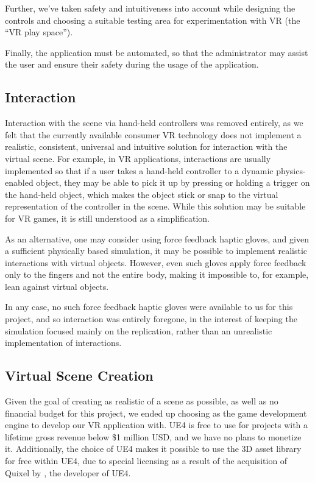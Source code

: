 Further, we've taken safety and intuitiveness into account while designing the controls and choosing a suitable testing area for experimentation with \ac{VR} (the ``\ac{VR} play space'').

Finally, the application must be automated, so that the administrator may assist the user and ensure their safety during the usage of the application.

\subsection{Interaction}
Interaction with the scene via hand-held controllers was removed entirely, as we felt that the currently available consumer \ac{VR} technology does not implement a realistic, consistent, universal and intuitive solution for interaction with the virtual scene. For example, in \ac{VR} applications, interactions are usually implemented so that if a user takes a hand-held controller to a dynamic physics-enabled object, they may be able to pick it up by pressing or holding a trigger on the hand-held object, which makes the object stick or snap to the virtual representation of the controller in the scene. While this solution may be suitable for \ac{VR} games, it is still understood as a simplification.

As an alternative, one may consider using force feedback haptic gloves, and given a sufficient physically based simulation, it may be possible to implement realistic interactions with virtual objects. However, even such gloves apply force feedback only to the fingers and not the entire body, making it impossible to, for example, lean against virtual objects.

In any case, no such force feedback haptic gloves were available to us for this project, and so interaction was entirely foregone, in the interest of keeping the simulation focused mainly on the replication, rather than an unrealistic implementation of interactions.

\subsection{Virtual Scene Creation}
Given the goal of creating as realistic of a scene as possible, as well as no financial budget for this project, we ended up choosing  as the game development engine to develop our \ac{VR} application with. \ac{UE4} is free to use for projects with a lifetime gross revenue below \$1 million USD, and we have no plans to monetize it. Additionally, the choice of \ac{UE4} makes it possible to use the  3D asset library for free within \ac{UE4}, due to special licensing as a result of the acquisition of Quixel by , the developer of \ac{UE4}.

